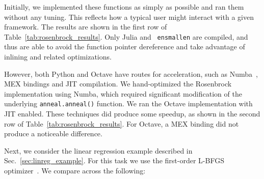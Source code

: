\documentclass{article}
\begin{document}
% 


Initially, we implemented these functions as simply as possible and ran them
without any tuning. This reflects how a typical user might interact with a
given framework.
The results are shown in the first row of
Table~\ref{tab:rosenbrock_results}.  Only Julia and {\tt
ensmallen} are compiled, and thus are able to avoid the function pointer
dereference and take advantage of inlining and related optimizations.

However, both Python and Octave have routes for acceleration,
such as Numba~\cite{TODO}, MEX bindings and JIT compilation.
We hand-optimized the Rosenbrock implementation using Numba,
which required significant modification of the 
underlying \texttt{\small anneal.anneal()} function.
We ran the Octave implementation with JIT enabled.
These techniques did produce some speedup,
as shown in the second row of Table~\ref{tab:rosenbrock_results}.
For Octave, a MEX binding did not produce a noticeable difference.

Next, we consider the linear regression example described in Sec.~\ref{sec:linreg_example}.
For this task we use the first-order L-BFGS optimizer~\cite{zhu1997algorithm}.
We compare across the following:
\end{document}
